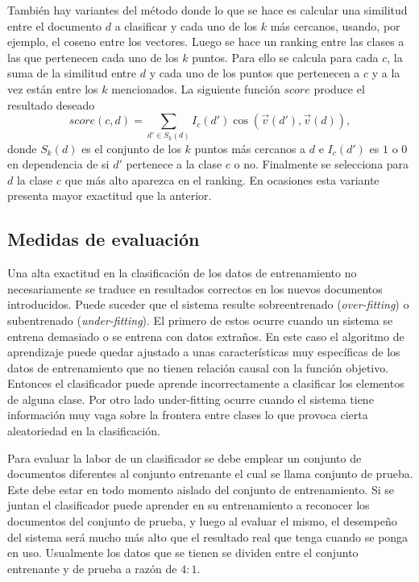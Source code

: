 \documentclass{llncs}
\begin{document}
		Tambi\'en hay variantes del m\'etodo donde lo que se hace es calcular una similitud entre el documento $d$ a clasificar y cada uno de los $k$ m\'as cercanos, usando, por ejemplo, el coseno entre los vectores. Luego se hace un ranking entre las clases a las que pertenecen cada uno de los $k$ puntos. Para ello se calcula para cada $c$, la suma de la similitud entre $d$ y cada uno de los puntos que pertenecen a $c$ y a la vez est\'an entre los $k$ mencionados. La siguiente funci\'on $score$ produce el resultado deseado
		\[
			score(c,d)  = \sum_{d'\in S_k(d)} I_c(d') \cos(\overrightarrow{v}(d'),\overrightarrow{v}(d)),
		\]
		donde $S_k(d)$ es el conjunto de los $k$ puntos m\'as cercanos a $d$ e $I_c(d')$ es $1$ o $0$ en dependencia de si $d'$ pertenece a la clase $c$ o no. Finalmente se selecciona para $d$ la clase $c$ que m\'as alto aparezca en el ranking. En ocasiones esta variante presenta mayor exactitud que la anterior.
		
		
		
		
	\subsection{Medidas de evaluaci\'on}
			
			Una alta exactitud en la clasificaci\'on de los datos de entrenamiento no necesariamente se traduce en resultados correctos en los nuevos documentos introducidos. Puede suceder que el sistema resulte sobreentrenado (\emph{over-fitting}) o subentrenado (\emph{under-fitting}). El primero de estos ocurre cuando un sistema se entrena demasiado o se entrena con datos extra\~nos. En este caso el algoritmo de aprendizaje puede quedar ajustado a unas caracter\'isticas muy espec\'ificas de los datos de entrenamiento que no tienen relaci\'on causal con la funci\'on objetivo. Entonces el clasificador puede aprende incorrectamente a clasificar los elementos de alguna clase. Por otro lado under-fitting ocurre cuando el sistema tiene informaci\'on muy vaga sobre la frontera entre clases lo que provoca cierta aleatoriedad en la clasificaci\'on.
			
			Para evaluar la labor de un clasificador se debe emplear un conjunto de documentos diferentes al conjunto entrenante el cual se llama conjunto de prueba. Este debe estar en todo momento aislado del conjunto de entrenamiento. Si se juntan el clasificador puede aprender en su entrenamiento a reconocer los documentos del conjunto de prueba, y luego  al evaluar el mismo, el desempe\~no del sistema ser\'a mucho m\'as alto que el resultado real que tenga cuando se ponga en uso. Usualmente los datos que se tienen se dividen entre el conjunto entrenante y de prueba a raz\'on de $4:1$.
			
\end{document}
